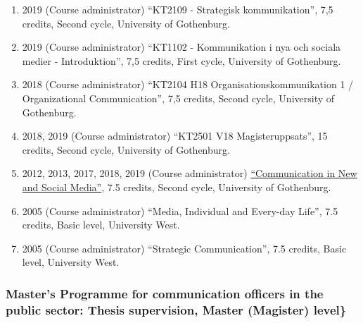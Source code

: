\documentclass[
]{article}
\providecommand{\tightlist}{%
  \setlength{\itemsep}{0pt}\setlength{\parskip}{0pt}}
\begin{document}
\begin{enumerate}
\def\labelenumi{\arabic{enumi}.}
\tightlist
\item
  2019 (Course administrator) ``KT2109 - Strategisk kommunikation'', 7,5
  credits, Second cycle, University of Gothenburg.
\item
  2019 (Course administrator) ``KT1102 - Kommunikation i nya och sociala
  medier - Introduktion'', 7,5 credits, First cycle, University of
  Gothenburg.
\item
  2018 (Course administrator) ``KT2104 H18 Organisationskommunikation 1
  / Organizational Communication'', 7,5 credits, Second cycle,
  University of Gothenburg.
\item
  2018, 2019 (Course administrator) ``KT2501 V18 Magisteruppsats'', 15
  credits, Second cycle, University of Gothenburg.
\item
  2012, 2013, 2017, 2018, 2019 (Course administrator)
  \href{http://files.christopherkullenberg.se/kursplaner/KT2102.pdf}{``Communication
  in New and Social Media''}, 7.5 credits, Second cycle, University of
  Gothenburg.
\item
  2005 (Course administrator) ``Media, Individual and Every-day Life'',
  7.5 credits, Basic level, University West.
\item
  2005 (Course administrator) ``Strategic Communication'', 7.5 credits,
  Basic level, University West.
\end{enumerate}

\hypertarget{masters-programme-for-communication-officers-in-the-public-sector-thesis-supervision-master-magister-level}{%
\subsubsection{Master's Programme for communication officers in the
public sector: Thesis supervision, Master (Magister)
level\}}\label{masters-programme-for-communication-officers-in-the-public-sector-thesis-supervision-master-magister-level}}
\end{document}
